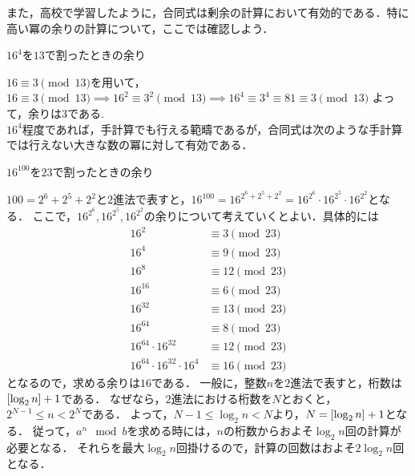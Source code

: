     また，高校で学習したように，合同式は剰余の計算において有効的である．特に高い冪の余りの計算について，ここでは確認しよう．

    \begin{ex} \label{1.4.22}
      $16^4$を$13$で割ったときの余り
    \end{ex}

    $16 \equiv 3 \pmod {13}$を用いて，$16 \equiv 3 \pmod {13} \implies 16^2 \equiv 3^2 \pmod {13} \implies 16^4 \equiv 3^4 \equiv 81 \equiv 3 \pmod {13}$
    よって，余りは$3$である.\\

    $16^4$程度であれば，手計算でも行える範疇であるが，合同式は次のような手計算では行えない大きな数の冪に対して有効である．

    \begin{ex} \label{1.4.22.1}
      $16^{100}$を$23$で割ったときの余り
    \end{ex}

    $100 = 2^6 + 2^5 + 2^2$と$2$進法で表すと，$16^{100} = 16^{2^6 + 2^5 + 2^2} = 16^{2^6} \cdot 16^{2^5} \cdot 16^{2^2}$となる．
    ここで，$16^{2^6}, 16^{2^5}, 16^{2^2}$の余りについて考えていくとよい．具体的には
    \begin{alignat*}
        16^2 &\equiv 3 \pmod {23} \nonumber \\
        16^4 &\equiv 9 \pmod {23} \nonumber \\
        16^8 &\equiv 12 \pmod {23} \nonumber \\
        16^{16} &\equiv 6 \pmod {23} \nonumber \\
        16^{32} &\equiv 13 \pmod {23} \nonumber \\
        16^{64} &\equiv 8 \pmod {23} \nonumber \\
        16^{64} \cdot 16^{32} &\equiv 12 \pmod {23} \nonumber \\
        16^{64} \cdot 16^{32} \cdot 16^4 &\equiv 16 \pmod {23} \nonumber
    \end{alignat*}
    となるので，求める余りは$16$である．
    一般に，整数$n$を$2$進法で表すと，桁数は$\lbrack\log_2 n\rbrack+1$である．
    なぜなら，$2$進法における桁数を$N$とおくと，$2^{N-1} \leq n < 2^N$である．
    よって，$N-1 \leq \log_2 n < N$より，$N = \lbrack\log_2 n\rbrack+1$となる．
    従って，$a^n \mod b$を求める時には，$n$の桁数からおよそ$\log_2 n$回の計算が必要となる．
    それらを最大$\log_2 n$回掛けるので，計算の回数はおよそ$2\log_2 n$回となる．


% 